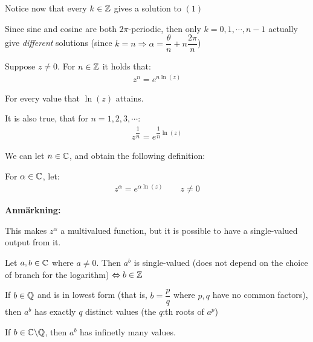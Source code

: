 \noindent Notice now that every $k\in\mathbb{Z}$ gives a solution to $(1)$
\par\bigskip
\noindent Since sine and cosine are both $2\pi$-periodic, then only $k = 0,1,\cdots,n-1$ actually give \textit{different} solutions (since $k=n\Rightarrow \alpha = \dfrac{\theta}{n}+n\dfrac{2\pi}{n}$)
\par\bigskip
\noindent Suppose $z\neq0$. For $n\in\mathbb{Z}$ it holds that:
\begin{equation*}
  \begin{gathered}
    z^n = e^{n\ln{\left(z\right)}}
  \end{gathered}
\end{equation*}\par
\noindent For every value that $\ln{\left(z\right)}$ attains.
\par\bigskip
\noindent It is also true, that for $n = 1,2,3,\cdots$:
\begin{equation*}
  \begin{gathered}
    z^{\dfrac{1}{n}} = e^{\dfrac{1}{n}\ln{\left(z\right)}}
  \end{gathered}
\end{equation*}
\par\bigskip
\noindent We can let $n\in\mathbb{C}$, and obtain the following definition:
\par\bigskip
\begin{theo}{}
  For $\alpha\in\mathbb{C}$, let:
  \begin{equation*}
    \begin{gathered}
      z^\alpha = e^{\alpha\ln{\left(z\right)}}\qquad z\neq0
    \end{gathered}
  \end{equation*}
\end{theo}
\par\bigskip
\noindent\textbf{Anmärkning:}\par
\noindent This makes $z^\alpha$ a multivalued function, but it is possible to have a single-valued output from it. 
\par\bigskip
\begin{theo}[]{}
  Let $a,b\in\mathbb{C}$ where $a\neq0$. Then $a^b$ is single-valued (does not depend on the choice of branch for the logarithm) $\Leftrightarrow b\in\mathbb{Z}$
  \par\bigskip
  \noindent If $b\in\mathbb{Q}$ and is in lowest form (that is, $b = \dfrac{p}{q}$ where $p,q$ have no common factors), then $a^b$ has exactly $q$ distinct values (the $q$:th roots of $a^p$) 
  \par\bigskip
  \noindent If $b\in\mathbb{C}\backslash\mathbb{Q}$, then $a^b$ has infinetly many values. 
\end{theo}
